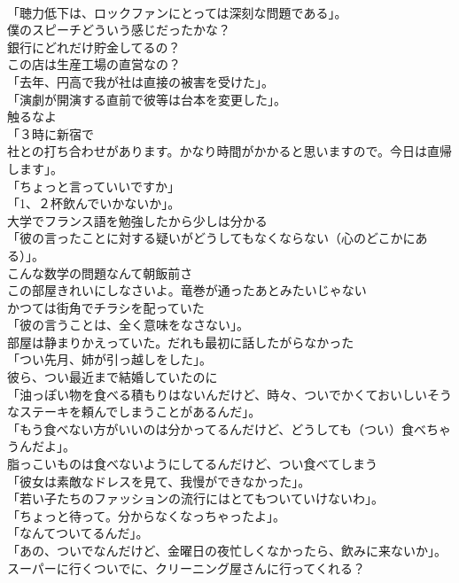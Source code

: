 \documentclass[8pt]{extreport}
\begin{document}
\begin{CJK}{UTF8}{min}
\\	「聴力低下は、ロックファンにとっては深刻な問題である」。	
\\	僕のスピーチどういう感じだったかな？	
\\	銀行にどれだけ貯金してるの？	
\\	この店は生産工場の直営なの？	
\\	「去年、円高で我が社は直接の被害を受けた」。	
\\	「演劇が開演する直前で彼等は台本を変更した」。	
\\	触るなよ	
\\	「３時に新宿で
\\	社との打ち合わせがあります。かなり時間がかかると思いますので。今日は直帰します」。	
\\	「ちょっと言っていいですか」	
\\	「1、２杯飲んでいかないか」。	
\\	大学でフランス語を勉強したから少しは分かる	
\\	「彼の言ったことに対する疑いがどうしてもなくならない（心のどこかにある）」。	
\\	こんな数学の問題なんて朝飯前さ	
\\	この部屋きれいにしなさいよ。竜巻が通ったあとみたいじゃない	
\\	かつては街角でチラシを配っていた	
\\	「彼の言うことは、全く意味をなさない」。	
\\	部屋は静まりかえっていた。だれも最初に話したがらなかった	
\\	「つい先月、姉が引っ越しをした」。	
\\	彼ら、つい最近まで結婚していたのに	
\\	「油っぽい物を食べる積もりはないんだけど、時々、ついでかくておいしいそうなステーキを頼んでしまうことがあるんだ」。	
\\	「もう食べない方がいいのは分かってるんだけど、どうしても（つい）食べちゃうんだよ」。	
\\	脂っこいものは食べないようにしてるんだけど、つい食べてしまう	
\\	「彼女は素敵なドレスを見て、我慢ができなかった」。	
\\	「若い子たちのファッションの流行にはとてもついていけないわ」。	
\\	「ちょっと待って。分からなくなっちゃったよ」。	
\\	「なんてついてるんだ」。	
\\	「あの、ついでなんだけど、金曜日の夜忙しくなかったら、飲みに来ないか」。	
\\	スーパーに行くついでに、クリーニング屋さんに行ってくれる？	

\end{CJK}
\end{document}
